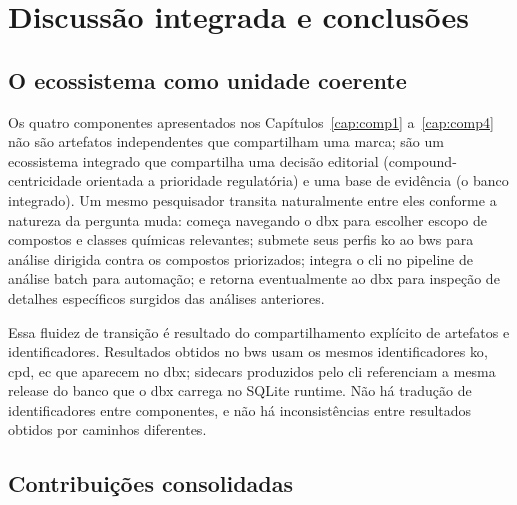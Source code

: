 \chapter{Discussão integrada e conclusões}
\label{cap:conclusao}

\section{O ecossistema como unidade coerente}
\label{sec:c7-ecossistema}

Os quatro componentes apresentados nos Capítulos~\ref{cap:comp1} a~\ref{cap:comp4} não são artefatos independentes que compartilham uma marca; são um ecossistema integrado que compartilha uma decisão editorial (compound-centricidade orientada a prioridade regulatória) e uma base de evidência (o banco integrado). Um mesmo pesquisador transita naturalmente entre eles conforme a natureza da pergunta muda: começa navegando o \gls{dbx} para escolher escopo de compostos e classes químicas relevantes; submete seus perfis \gls{ko} ao \gls{bws} para análise dirigida contra os compostos priorizados; integra o \gls{cli} no pipeline de análise batch para automação; e retorna eventualmente ao \gls{dbx} para inspeção de detalhes específicos surgidos das análises anteriores.

Essa fluidez de transição é resultado do compartilhamento explícito de artefatos e identificadores. Resultados obtidos no \gls{bws} usam os mesmos identificadores \gls{ko}, \gls{cpd}, \gls{ec} que aparecem no \gls{dbx}; sidecars produzidos pelo \gls{cli} referenciam a mesma release do banco que o \gls{dbx} carrega no SQLite runtime. Não há tradução de identificadores entre componentes, e não há inconsistências entre resultados obtidos por caminhos diferentes.

\section{Contribuições consolidadas}
\label{sec:c7-contribuicoes}

